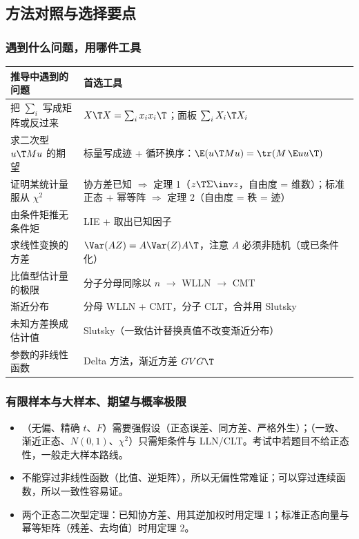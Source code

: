 \subsection{方法对照与选择要点}

\subsubsection{遇到什么问题，用哪件工具}

\begin{center}
\small
\begin{tabularx}{\linewidth}{LL}
\toprule
推导中遇到的问题 & 首选工具\\
\midrule
把 $\sum_i$ 写成矩阵或反过来 & $X\T X=\sum_ix_ix_i\T$；面板 $\sum_iX_i\T X_i$\\
求二次型 $u\T Mu$ 的期望 & 标量写成迹 + 循环换序：$\E(u\T Mu)=\tr(M\,\E uu\T)$\\
证明某统计量服从 $\chi^2$ & 协方差已知 $\Rightarrow$ 定理 1（$z\T\Sigma\inv z$，自由度 = 维数）；标准正态 + 幂等阵 $\Rightarrow$ 定理 2（自由度 = 秩 = 迹）\\
由条件矩推无条件矩 & LIE + 取出已知因子\\
求线性变换的方差 & $\Var(AZ)=A\Var(Z)A\T$，注意 $A$ 必须非随机（或已条件化）\\
比值型估计量的极限 & 分子分母同除以 $n$ $\to$ WLLN $\to$ CMT\\
渐近分布 & 分母 WLLN + CMT，分子 CLT，合并用 Slutsky\\
未知方差换成估计值 & Slutsky（一致估计替换真值不改变渐近分布）\\
参数的非线性函数 & Delta 方法，渐近方差 $GVG\T$\\
\bottomrule
\end{tabularx}
\end{center}

\subsubsection{有限样本与大样本、期望与概率极限}

\begin{itemize}
  \item {}（无偏、精确 $t$、$F$）需要强假设（正态误差、同方差、严格外生）；（一致、渐近正态、$N(0,1)$、$\chi^2$）只需矩条件与 LLN/CLT。考试中若题目不给正态性，一般走大样本路线。
  \item {}不能穿过非线性函数（比值、逆矩阵），所以无偏性常难证；可以穿过连续函数，所以一致性容易证。
  \item 两个正态二次型定理：已知协方差、用其逆加权时用定理 1；标准正态向量与幂等矩阵（残差、去均值）时用定理 2。
\end{itemize}

